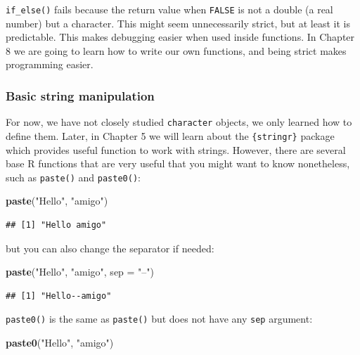 \documentclass[]{gitbook}
\newenvironment{Shaded}{\begin{snugshade}}{\end{snugshade}}
\newcommand{\DataTypeTok}[1]{\textcolor[rgb]{0.13,0.29,0.53}{#1}}
\newcommand{\KeywordTok}[1]{\textcolor[rgb]{0.13,0.29,0.53}{\textbf{#1}}}
\newcommand{\NormalTok}[1]{#1}
\newcommand{\StringTok}[1]{\textcolor[rgb]{0.31,0.60,0.02}{#1}}
\begin{document}
\texttt{if\_else()} fails because the return value when \texttt{FALSE} is not a double (a real number) but a character. This might seem unnecessarily
strict, but at least it is predictable. This makes debugging easier when used inside functions. In Chapter 8 we are going to learn how
to write our own functions, and being strict makes programming easier.

\hypertarget{basic-string-manipulation}{%
\subsubsection{Basic string manipulation}\label{basic-string-manipulation}}

For now, we have not closely studied \texttt{character} objects, we only learned how to define them. Later, in Chapter 5 we will learn about the
\texttt{\{stringr\}} package which provides useful function to work with strings. However, there are several base R functions that are very
useful that you might want to know nonetheless, such as \texttt{paste()} and \texttt{paste0()}:

\begin{Shaded}
\begin{Highlighting}[]
\KeywordTok{paste}\NormalTok{(}\StringTok{"Hello"}\NormalTok{, }\StringTok{"amigo"}\NormalTok{)}
\end{Highlighting}
\end{Shaded}

\begin{verbatim}
## [1] "Hello amigo"
\end{verbatim}

but you can also change the separator if needed:

\begin{Shaded}
\begin{Highlighting}[]
\KeywordTok{paste}\NormalTok{(}\StringTok{"Hello"}\NormalTok{, }\StringTok{"amigo"}\NormalTok{, }\DataTypeTok{sep =} \StringTok{"--"}\NormalTok{)}
\end{Highlighting}
\end{Shaded}

\begin{verbatim}
## [1] "Hello--amigo"
\end{verbatim}

\texttt{paste0()} is the same as \texttt{paste()} but does not have any \texttt{sep} argument:

\begin{Shaded}
\begin{Highlighting}[]
\KeywordTok{paste0}\NormalTok{(}\StringTok{"Hello"}\NormalTok{, }\StringTok{"amigo"}\NormalTok{)}
\end{Highlighting}
\end{Shaded}
\end{document}
